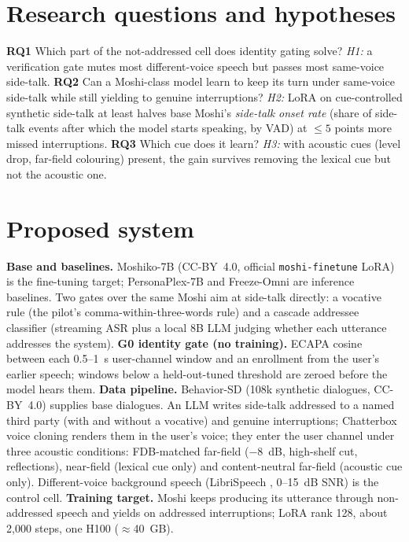 \documentclass[11pt]{article}
\begin{document}
\section{Research questions and hypotheses}
\textbf{RQ1} Which part of the not-addressed cell does identity gating solve? \textit{H1:} a verification gate mutes most different-voice speech but passes most same-voice side-talk. \textbf{RQ2} Can a Moshi-class model learn to keep its turn under same-voice side-talk while still yielding to genuine interruptions? \textit{H2:} LoRA on cue-controlled synthetic side-talk at least halves base Moshi's \emph{side-talk onset rate} (share of side-talk events after which the model starts speaking, by VAD) at $\leq 5$ points more missed interruptions. \textbf{RQ3} Which cue does it learn? \textit{H3:} with acoustic cues (level drop, far-field colouring) present, the gain survives removing the lexical cue but not the acoustic one.

\section{Proposed system}
\textbf{Base and baselines.} Moshiko-7B \citep{defossez2024moshi} (CC-BY~4.0, official \texttt{moshi-finetune} LoRA) is the fine-tuning target; PersonaPlex-7B \citep{roy2026personaplex} and Freeze-Omni are inference baselines. Two gates over the same Moshi aim at side-talk directly: a vocative rule (the pilot's comma-within-three-words rule) and a cascade addressee classifier (streaming ASR plus a local 8B LLM judging whether each utterance addresses the system).
\textbf{G0 identity gate (no training).} ECAPA \citep{desplanques2020ecapa} cosine between each 0.5--1~s user-channel window and an enrollment from the user's earlier speech; windows below a held-out-tuned threshold are zeroed before the model hears them.
\textbf{Data pipeline.} Behavior-SD \citep{lee2025behaviorsd} (108k synthetic dialogues, CC-BY~4.0) supplies base dialogues. An LLM writes side-talk addressed to a named third party (with and without a vocative) and genuine interruptions; Chatterbox \citep{resemble2025chatterbox} voice cloning renders them in the user's voice; they enter the user channel under three acoustic conditions: FDB-matched far-field ($-8$~dB, high-shelf cut, reflections), near-field (lexical cue only) and content-neutral far-field (acoustic cue only). Different-voice background speech (LibriSpeech \citep{panayotov2015librispeech}, 0--15~dB SNR) is the control cell.
\textbf{Training target.} Moshi keeps producing its utterance through non-addressed speech and yields on addressed interruptions; LoRA rank 128, about 2{,}000 steps, one H100 ($\approx$40~GB).
\end{document}
